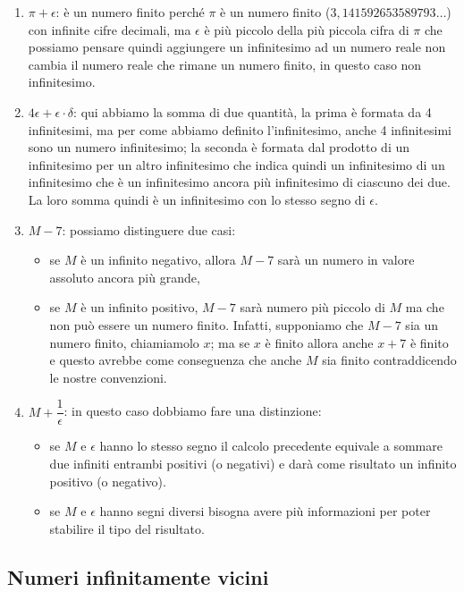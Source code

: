 \begin{esempio}
\begin{enumerate}
 \item \(\pi+\epsilon\): 
è un numero finito perché \(\pi\) è un numero 
finito (\(3,141592653589793\dots\)) con infinite cifre decimali, ma 
\(\epsilon\) è più piccolo della più piccola cifra di \(\pi\) che possiamo 
pensare quindi aggiungere un infinitesimo ad un numero reale non cambia il 
numero reale che rimane un numero finito, in questo caso non infinitesimo.
 \item  \(4\epsilon+\epsilon \cdot \delta\): 
qui abbiamo la somma di due quantità, 
la prima è formata da 4 infinitesimi, ma per come abbiamo definito 
l'infinitesimo, anche 4 infinitesimi sono un numero infinitesimo; la 
seconda è formata dal prodotto di un infinitesimo per un altro infinitesimo 
che indica quindi un infinitesimo di un infinitesimo che è un infinitesimo 
ancora più infinitesimo di ciascuno dei due. La loro somma quindi è un 
infinitesimo con lo stesso segno di \(\epsilon\).
 \item \(M-7\):
possiamo distinguere due casi: 
 \begin{itemize} [noitemsep]
  \item se \(M\) è un infinito negativo, allora 
\(M-7\) sarà un numero in valore assoluto ancora più grande, 
 \item se \(M\) è un infinito positivo, \(M-7\) sarà numero più piccolo di 
\(M\) ma che non può essere un numero finito. 
Infatti, supponiamo che \(M-7\) sia un numero finito, chiamiamolo \(x\); ma 
se \(x\) è finito allora anche \(x+7\) è finito e questo avrebbe come 
conseguenza che anche \(M\) sia finito contraddicendo le nostre convenzioni.
 \end{itemize}
 \item \(M+\dfrac{1}{\epsilon}\):
 in questo caso dobbiamo fare una distinzione:
 \begin{itemize} [noitemsep]
  \item se \(M\) e \(\epsilon\) hanno lo stesso segno il calcolo precedente 
equivale a sommare due infiniti entrambi positivi (o negativi) e darà come 
risultato un infinito positivo (o negativo).
  \item se \(M\) e \(\epsilon\) hanno segni diversi bisogna avere più 
informazioni per poter stabilire il tipo del risultato.
 \end{itemize}

\end{enumerate}
\end{esempio}

\subsection{Numeri infinitamente vicini}
\label{subsec:insnum_infinitamentevicini}

